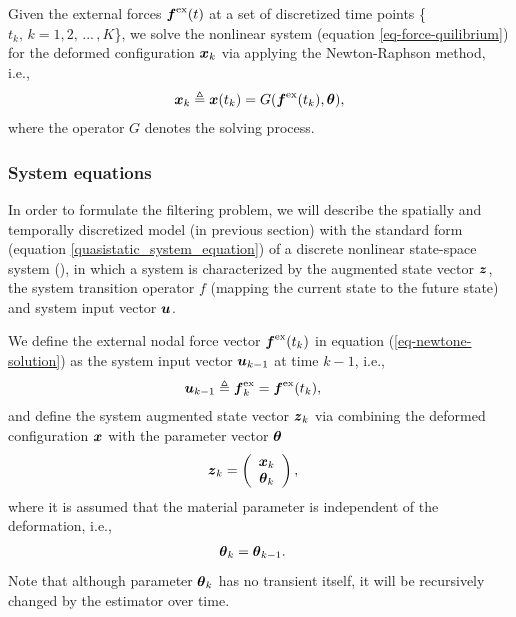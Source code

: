 Given the external forces $\vect{F}^\textnormal{ex}(t)$ at a set of discretized time points \{$t_k, \, k=1,2,\,...\,,K$\}, we solve the nonlinear system (equation \ref{eq-force-quilibrium}) for the deformed configuration $\vect{x}_k $ via applying the Newton-Raphson method, i.e.,
\begin{align}
\vect{x}_k \triangleq \vect{x}(t_k) = G(\vect{F}^\textnormal{ex}(t_k), \vect{\theta}), \label{eq-newtone-solution}
\end{align}
where the operator $G$ denotes the solving process.

\subsubsection*{System equations}
In order to formulate the filtering problem, we will describe the spatially and temporally discretized model (in previous section) with the standard form (equation \ref{quasistatic_system_equation}) of a discrete nonlinear state-space system (\citealt[chapter 6]{Franklin2005Feedback}), in which a system is characterized by the   augmented state vector $\vect{z}$, the system transition operator $f$ (mapping the current state to the future state) and system input vector $\vect{u}$.

We define the external nodal force vector $\vect{F}^\textnormal{ex}(t_k)$ in equation (\ref{eq-newtone-solution}) as the system input vector $\vect{u}_{k-1}$ at time $k-1$, i.e.,
\begin{align}
\vect{u}_{k-1} &\triangleq \vect{F}^\textnormal{ex}_k = \vect{F}^\textnormal{ex}(t_k),
\end{align}
and define the system augmented state vector $\vect{z}_k$ via combining the deformed configuration $\vect{x}$ with the parameter vector $\vect{\theta}$
\begin{align}
\vect{z}_k &= \left( \begin{array}{c}  \vect{x}_k \\  \vect{\theta}_k \\ \end{array} \right) , \label{eq-augmented-state}
\end{align}
where it is assumed that the material parameter is independent of the deformation, i.e.,
\begin{align}
\vect{\theta}_k &= \vect{\theta}_{k-1}. \label{eq-constant-parameter}
\end{align}
Note that although parameter $\vect{\theta}_k$ has no transient itself, it will be recursively changed by the estimator over time.

